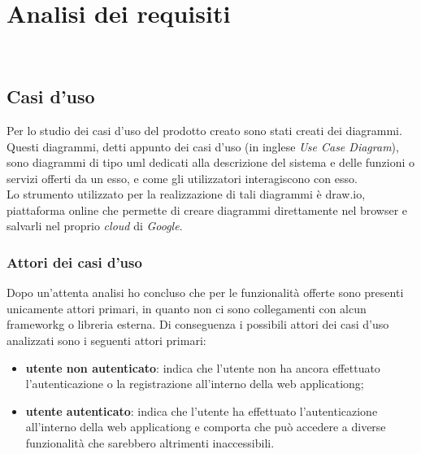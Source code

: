 
\chapter{Analisi dei requisiti}
\label{cap:analisi-requisiti}

\\

\section{Casi d'uso}
\label{sec:casi-uso}

Per lo studio dei casi d'uso del prodotto creato sono stati creati dei diagrammi.
Questi diagrammi, detti appunto dei casi d'uso (in inglese \textit{Use Case Diagram}), sono diagrammi di tipo \gls{uml} dedicati alla descrizione del sistema e delle funzioni o servizi offerti da un esso, e come gli utilizzatori interagiscono con esso.\\
Lo strumento utilizzato per la realizzazione di tali diagrammi è draw.io, piattaforma online che permette di creare diagrammi direttamente nel browser e salvarli nel proprio \textit{cloud} di \textit{Google}.

\subsection{Attori dei casi d'uso}
\label{subsec:attori}

Dopo un'attenta analisi ho concluso che per le funzionalità offerte sono presenti unicamente attori primari, in quanto non ci sono collegamenti con alcun \gls{frameworkg} o libreria esterna.
Di conseguenza i possibili attori dei casi d'uso analizzati sono i seguenti attori primari:
\begin{itemize}
	\item \textbf{utente non autenticato}: indica che l'utente non ha ancora effettuato l'autenticazione o la registrazione all'interno della \gls{web applicationg};
	\item \textbf{utente autenticato}: indica che l'utente ha effettuato l'autenticazione all'interno della \gls{web applicationg} e comporta che può accedere a diverse funzionalità che sarebbero altrimenti inaccessibili.
\end{itemize}

